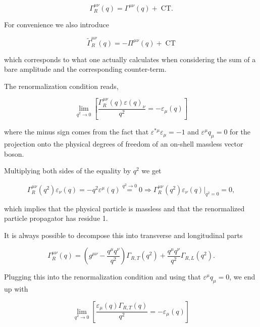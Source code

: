 \documentclass[../FeynCalcManual.tex]{subfiles}
\begin{document}
\begin{equation}
    \Gamma_R^{\mu \nu} (q) = \Gamma^{\mu \nu} (q) + \;\text{CT}.
\end{equation}

For convenience we also introduce

\begin{equation}
    \tilde{\Gamma}^{\mu \nu}_R(q) = - \Pi^{\mu \nu} (q) + \;\text{CT}
\end{equation}

which corresponds to what one actually calculates when considering the
sum of a bare amplitude and the corresponding counter-term.

The renormalization condition reads,

\begin{equation}
\lim_{q^2 \to 0} \left [ \frac{\Gamma_R^{\mu \nu} (q) \varepsilon(q)_\nu}{q^2}  = - \varepsilon_{\mu}(q) \right ]
\end{equation}

where the minus sign comes from the fact that
\(\varepsilon^{\ast \mu} \varepsilon_\mu = -1\) and
\(\varepsilon^\mu q_\mu =0\) for the projection onto the physical
degrees of freedom of an on-shell massless vector boson.

Multiplying both sides of the equality by \(q^2\) we get

\begin{equation}
\Gamma_R^{\mu \nu} (q^2)   \varepsilon_\nu (q) = - q^2 \varepsilon^{\mu}(q) \overset{q^2 \to 0}{=} 0 \Rightarrow \Gamma_R^{\mu \nu} (q^2) \varepsilon_\nu (q) \biggl|_{q^2=0}  = 0,
\end{equation}

which implies that the physical particle is massless and that the
renormalized particle propagator has residue 1.

It is always possible to decompose this into transverse and longitudinal
parts

\begin{equation}
\Gamma_R^{\mu \nu} (q) = \left ( g^{\mu \nu} - \frac{q^\mu q^\nu}{q^2} \right ) \Gamma_{R,T} (q^2) + \frac{q^\mu q^\nu}{q^2} \Gamma_{R,L} (q^2).
\end{equation}

Plugging this into the renormalization condition and using that
\(\varepsilon^\mu q_\mu = 0\), we end up with

\begin{equation}
        \lim_{q^2 \to 0} \left [ \frac{\varepsilon_{\mu}(q) \Gamma_{R,T} (q)}{q^2}  = - \varepsilon_{\mu}(q) \right ]
\end{equation}
\end{document}
